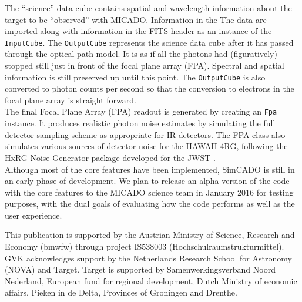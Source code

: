 \documentclass[11pt,twoside]{article}
\begin{document}
 The ``science'' data cube contains spatial and wavelength information about the target to be ``observed'' with MICADO. Information in the The data are imported along with information in the FITS header as an instance of the \verb"InputCube". The \verb"OutputCube" represents the science data cube after it has passed through the optical path model. It is as if all the photons had (figuratively) stopped still just in front of the focal plane array (FPA). Spectral and spatial information is still preserved up until this point. The \verb"OutputCube" is also converted to photon counts per second so that the conversion to electrons in the focal plane array is straight forward. \\

 The final Focal Plane Array (FPA) readout is generated by creating an \verb"Fpa" instance. It produces realistic photon noise estimates by simulating the full detector sampling scheme as appropriate for IR detectors. The FPA class also simulates various sources of detector noise for the HAWAII 4RG, following the HxRG Noise Generator package developed for the JWST \citep{HxRG}.\\

Although most of the core features have been implemented, SimCADO is still in an early phase of development. We plan to release an alpha version of the code with the core features to the MICADO science team in January 2016 for testing purposes, with the dual goals of evaluating how the code performs as well as the user experience. 
 
\acknowledgements This publication is supported by the Austrian Ministry of Science, Research and Economy (bmwfw) through project IS538003 (Hochschulraumstrukturmittel). GVK acknowledges support by the Netherlands Research School for Astronomy (NOVA) and Target. 
Target is supported by Samenwerkingsverband Noord Nederland, European fund for regional development, Dutch Ministry of economic affairs, Pieken in de Delta, Provinces of Groningen and Drenthe.


\end{document}
